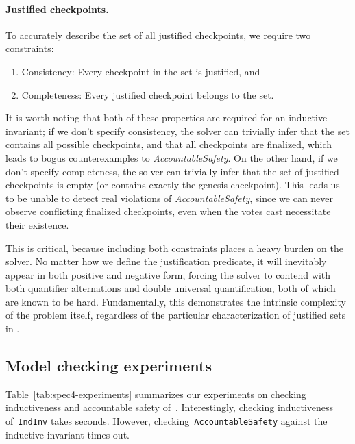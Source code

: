 \paragraph{Justified checkpoints.} To accurately describe the set of all justified checkpoints, we require two constraints:
\begin{enumerate}
	\item Consistency: Every checkpoint in the set is justified, and 
	\item Completeness: Every justified checkpoint belongs to the set.
\end{enumerate}
It is worth noting that both of these properties are required for an inductive invariant; if we don't specify consistency, the solver can trivially infer that the set contains all possible checkpoints, and that all checkpoints are finalized, which leads to bogus counterexamples to \textit{AccountableSafety}.
On the other hand, if we don't specify completeness, the solver can trivially infer that the set of justified checkpoints is empty (or contains exactly the genesis checkpoint). This leads us to be unable to detect real violations of \textit{AccountableSafety}, since we can never observe conflicting finalized checkpoints, even when the votes cast necessitate their existence.

This is critical, because including both constraints places a heavy burden on the solver. No matter how we define the justification predicate, it will inevitably appear in both positive and negative form, forcing the solver to contend with both quantifier alternations and double universal quantification, both of which are known to be hard.
Fundamentally, this demonstrates the intrinsic complexity of the problem itself, regardless of the particular characterization of justified sets in \tlap{}.

\subsection{Model checking experiments}

Table~\ref{tab:spec4-experiments} summarizes our experiments on checking
inductiveness and accountable safety of~\SpecFourB{}. Interestingly, checking
inductiveness of~\texttt{IndInv} takes seconds. However,
checking~\texttt{AccountableSafety} against the inductive invariant times out.


